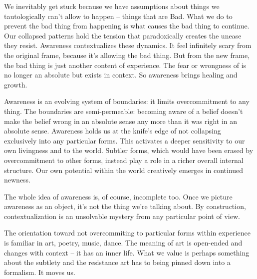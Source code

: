 \documentclass[12pt]{article}
\begin{document}
We inevitably get stuck because we have assumptions about things we tautologically can't allow to happen -- things that are Bad. What we do to prevent the bad thing from happening is what causes the bad thing to continue. Our collapsed patterns hold the tension that paradoxically creates the unease they resist. Awareness contextualizes these dynamics. It feel infinitely scary from the original frame, because it's allowing the bad thing. But from the new frame, the bad thing is just another content of experience. The fear or wrongness of is no longer an absolute but exists in context. So awareness brings healing and growth. 


Awareness is an evolving system of boundaries: it limits overcommitment to any thing. The boundaries are semi-permeable: becoming aware of a belief doesn't make the belief wrong in an absolute sense any more than it was right in an absolute sense. Awareness holds us at the knife's edge of not collapsing exclusively into any particular forms. This activates a deeper sensitivity to our own livingness and to the world. Subtler forms, which would have been erased by overcommitment to other forms, instead play a role in a richer overall internal structure. Our own potential within the world creatively emerges in continued newness. 


The whole idea of awareness is, of course, incomplete too. Once we picture awareness as an object, it's not the thing we're talking about. By construction, contextualization is an unsolvable mystery from any particular point of view.

The orientation toward not overcommiting to particular forms within experience is familiar in art, poetry, music, dance. The meaning of art is open-ended and changes with context -- it has an inner life. What we value is perhaps something about the subtlety and the resistance art has to being pinned down into a formalism. It moves us.



\end{document}
